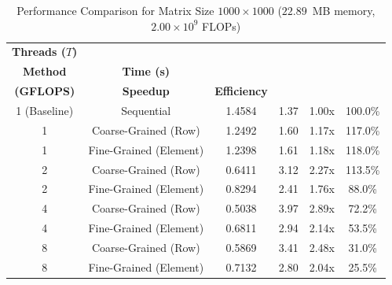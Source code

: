 \documentclass[12pt]{article}
\begin{document}
\begin{table}[H]
\centering
\caption{Performance Comparison for Matrix Size $1000 \times 1000$ ($22.89$~MB memory, $2.00 \times 10^9$ FLOPs)}
\vspace{0.15cm}
\begin{tabular}{cccccc}
\toprule
\textbf{Threads ($T$)} & \shortstack{\textbf{Decomposition}\\\textbf{Method}} & \textbf{Time (s)} & \shortstack{\textbf{Throughput}\\\textbf{(GFLOPS)}} & \textbf{Speedup} & \textbf{Efficiency} \\
\midrule
1 (Baseline) & Sequential & 1.4584 & 1.37 & 1.00x & 100.0\% \\
\midrule
1 & Coarse-Grained (Row) & 1.2492 & 1.60 & 1.17x & 117.0\% \\
1 & Fine-Grained (Element) & 1.2398 & 1.61 & 1.18x & 118.0\% \\
\midrule
2 & Coarse-Grained (Row) & 0.6411 & 3.12 & 2.27x & 113.5\% \\
2 & Fine-Grained (Element) & 0.8294 & 2.41 & 1.76x & 88.0\% \\
\midrule
4 & Coarse-Grained (Row) & 0.5038 & 3.97 & 2.89x & 72.2\% \\
4 & Fine-Grained (Element) & 0.6811 & 2.94 & 2.14x & 53.5\% \\
\midrule
8 & Coarse-Grained (Row) & 0.5869 & 3.41 & 2.48x & 31.0\% \\
8 & Fine-Grained (Element) & 0.7132 & 2.80 & 2.04x & 25.5\% \\
\bottomrule
\end{tabular}
\end{table}
\end{document}
